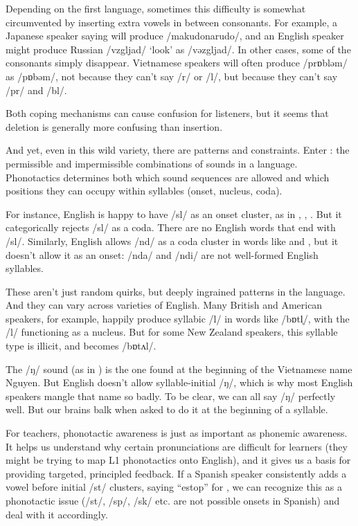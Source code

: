 Depending on the first language, sometimes this difficulty is somewhat circumvented by inserting extra vowels in between consonants. For example, a Japanese speaker saying  will produce /makudonarudo/, and an English speaker might produce Russian /vzgljad/ `look' as /vəzgljad/. In other cases, some of the consonants simply disappear. Vietnamese speakers will often produce  /prɒbləm/ as /pɒbəm/, not because they can't say /r/ or /l/, but because they can't say /pr/ and /bl/.

Both coping mechanisms can cause confusion for listeners, but it seems that deletion is generally more confusing than insertion.

And yet, even in this wild variety, there are patterns and constraints. Enter : the permissible and impermissible combinations of sounds in a language. Phonotactics determines both which sound sequences are allowed and which positions they can occupy within syllables (onset, nucleus, coda).

For instance, English is happy to have /sl/ as an onset cluster, as in , , . But it categorically rejects /sl/ as a coda. There are no English words that end with /sl/. Similarly, English allows /nd/ as a coda cluster in words like  and , but it doesn't allow it as an onset: /nda/ and /ndi/ are not well-formed English syllables.

These aren't just random quirks, but deeply ingrained patterns in the language. And they can vary across varieties of English. Many British and American speakers, for example, happily produce syllabic /l/ in words like  /bɒtl̩/, with the /l/ functioning as a nucleus. But for some New Zealand speakers, this syllable type is illicit, and  becomes /bɒtʌl/.

The /ŋ/ sound (as in ) is the one found at the beginning of the Vietnamese name Nguyen. But English doesn't allow syllable-initial /ŋ/, which is why most English speakers mangle that name so badly. To be clear, we can all say /ŋ/ perfectly well. But our brains balk when asked to do it at the beginning of a syllable.

For teachers, phonotactic awareness is just as important as phonemic awareness. It helps us understand why certain pronunciations are difficult for learners (they might be trying to map L1 phonotactics onto English), and it gives us a basis for providing targeted, principled feedback. If a Spanish speaker consistently adds a vowel before initial /st/ clusters, saying ``estop'' for , we can recognize this as a phonotactic issue (/st/, /sp/, /sk/ etc. are not possible onsets in Spanish) and deal with it accordingly.

